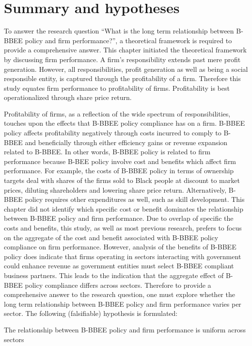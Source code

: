 \section{Summary and hypotheses}
To answer the research question “What is the long term relationship between B-BBEE policy and firm performance?”, a theoretical framework is required to provide a comprehensive answer. This chapter initiated the theoretical framework by  discussing firm performance. A firm’s responsibility extends past mere profit generation. However, all responsibilities, profit generation as well as being a social responsible entity, is captured through the profitability of a firm. Therefore this study equates firm performance to profitability of firms. Profitability is best operationalized through share price return.

Profitability of firms, as a reflection of the wide spectrum of responsibilities, touches upon the effects that B-BBEE policy compliance has on a firm. B-BBEE policy affects profitability negatively through costs incurred to comply to B-BBEE and beneficially through either efficiency gains or revenue expansion related to B-BBEE. In other words, B-BBEE policy is related to firm performance because B-BEE policy involve cost and benefits which affect firm performance. For example, the costs of B-BBEE policy in terms of ownership targets deal with shares of the firms sold to Black people at discount to market prices, diluting shareholders and lowering share price return. Alternatively, B-BBEE policy requires other expenditures as well, such as skill development. This chapter did not identify which specific cost or benefit dominates the relationship between B-BBEE policy and firm performance. Due to overlap of specific the costs and benefits, this study, as well as most previous research, prefers to focus on the aggregate of the cost and benefit associated with B-BBEE policy compliance on firm performance. However, analysis of the benefits of B-BBEE policy does indicate that firms operating in sectors interacting with government could enhance revenue as government entities must select B-BBEE compliant business partners. This leads to the indication that the aggregate effect of B-BBEE policy compliance differs across sectors. Therefore to provide a comprehensive answer to the research question, one must explore whether the long term relationship between B-BBEE policy and firm performance varies per sector. The following (falsifiable) hypothesis is formulated:
\begin{nullhypothesis}The relationship between B-BBEE policy and firm performance is uniform across sectors\end{nullhypothesis}

